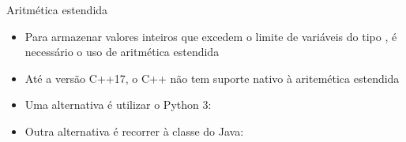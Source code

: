 \begin{frame}[fragile]{Aritmética estendida}

    \begin{itemize}
        \item Para armazenar valores inteiros que excedem o limite de variáveis do tipo
            , é necessário o uso de aritmética estendida

        \item Até a versão C++17, o C++ não tem suporte nativo à aritemética estendida

        \item Uma alternativa é utilizar o Python 3:

        \item Outra alternativa é recorrer à classe  do Java:
    \end{itemize}

\end{frame}
